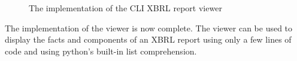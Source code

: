 \begin{figure}[H]
    \centering
    
    \caption{The implementation of the CLI XBRL report viewer}
    \label{fig:viewer_4}
\end{figure}

The implementation of the viewer is now complete.
The viewer can be used to display the facts and components of an XBRL report using only a few lines of code and using python's built-in list comprehension.






